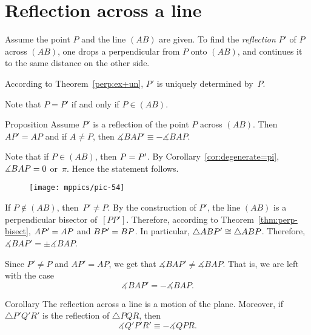 \section*{Reflection across a line}

Assume the point $P$ and the line $(AB)$ are given.
To find the \emph{reflection} $P'$ of $P$ across $(AB)$,
one drops a perpendicular from $P$ onto $(AB)$, 
and continues it to the same distance on the other side.

According to Theorem~\ref{perp:ex+un}, $P'$ is uniquely determined by~$P$.

Note that $P=P'$ if and only if $P\in(AB)$.

\begin{thm}[\abs]{Proposition}\label{prop:reflection}
Assume $P'$ is a reflection of the point $P$ across $(AB)$.
Then $AP'=AP$ 
and if $A\ne P$, 
then
$\measuredangle BAP'\equiv -\measuredangle BAP$.
\end{thm}

Note that if $P\in (AB)$, 
then $P\z=P'$. 
By Corollary~\ref{cor:degenerate=pi}, $\measuredangle BAP\z=0$ or~$\pi$.
Hence the statement follows.

{

\begin{wrapfigure}{o}{37mm}
\vskip-2mm
\centering
\texttt{[image: mppics/pic-54]}
\end{wrapfigure}

If $P\notin (AB)$, then~$P'\ne P$.
By the construction of $P'$, 
the line $(AB)$ is a perpendicular bisector of~$[PP']$.
Therefore, according to Theorem~\ref{thm:perp-bisect}, $AP'\z=AP$ and $BP'\z=BP$.
In particular, 
$\triangle ABP'\z\cong \triangle ABP$.
Therefore, $\measuredangle BAP'=\pm \measuredangle BAP$.

Since $P'\ne P$ and $AP'=AP$,
we get that $\measuredangle BAP'\ne \measuredangle BAP$.
That is, we are left with the case
$$\measuredangle BAP'=-\measuredangle BAP.$$
\qedsf

}


\begin{thm}[\abs]{Corollary}\label{cor:reflection+angle}
The reflection across a line is a motion of the plane. 
Moreover, if $\triangle P'Q'R'$ is the reflection of $\triangle PQR$,
then 
$$\measuredangle Q'P'R'\equiv -\measuredangle QPR.$$

\end{thm}


